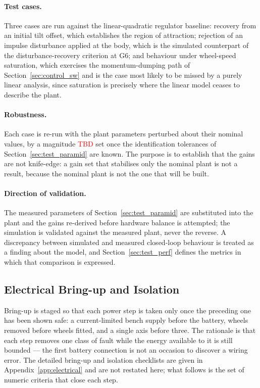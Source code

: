\paragraph{Test cases.} Three cases are run against the linear-quadratic
regulator baseline: recovery from an initial tilt offset, which establishes the
region of attraction; rejection of an impulse disturbance applied at the body,
which is the simulated counterpart of the disturbance-recovery criterion at G6;
and behaviour under wheel-speed saturation, which exercises the momentum-dumping
path of Section~\ref{sec:control_sw} and is the case most likely to be missed by
a purely linear analysis, since saturation is precisely where the linear model
ceases to describe the plant.

\paragraph{Robustness.} Each case is re-run with the plant parameters perturbed
about their nominal values, by a magnitude \textcolor{red}{TBD} set once the
identification tolerances of Section~\ref{sec:test_paramid} are known. The
purpose is to establish that the gains are not knife-edge: a gain set that
stabilises only the nominal plant is not a result, because the nominal plant is
not the one that will be built.

\paragraph{Direction of validation.} The measured parameters of
Section~\ref{sec:test_paramid} are substituted into the plant and the gains
re-derived before hardware balance is attempted; the simulation is validated
against the measured plant, never the reverse. A discrepancy between simulated
and measured closed-loop behaviour is treated as a finding about the model, and
Section~\ref{sec:test_perf} defines the metrics in which that comparison is
expressed.

\subsection{Electrical Bring-up and Isolation}
\label{sec:test_electrical}

Bring-up is staged so that each power step is taken only once the preceding one
has been shown safe: a current-limited bench supply before the battery, wheels
removed before wheels fitted, and a single axis before three. The rationale is
that each step removes one class of fault while the energy available to it is
still bounded --- the first battery connection is not an occasion to discover a
wiring error. The detailed bring-up and isolation checklists are given in
Appendix~\ref{app:electrical} and are not restated here; what follows is the set
of numeric criteria that close each step.

